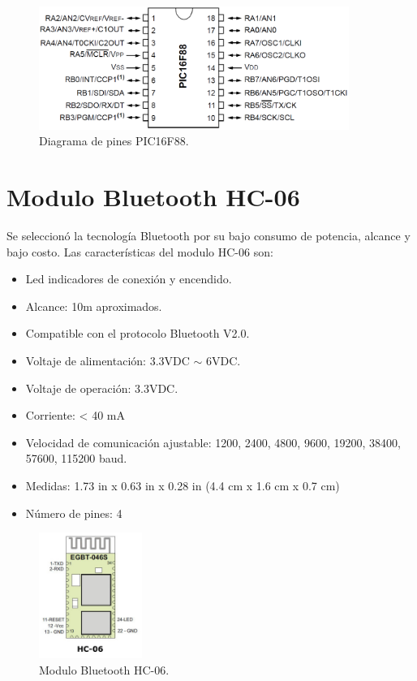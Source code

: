 \begin{figure}[H]
\centering
\includegraphics[width=0.9\textwidth]{./image/PIC16F88.png}
\caption{Diagrama de pines PIC16F88.}
\label{fig:PIC16F88}
\end{figure}


\section{Modulo Bluetooth HC-06}

Se seleccionó la tecnología Bluetooth por su bajo consumo de potencia, alcance y bajo costo. Las características del modulo HC-06 son:
\begin{itemize}
\item Led indicadores de conexión y encendido.
\item Alcance: 10m aproximados.
\item Compatible con el protocolo Bluetooth V2.0.
\item Voltaje de alimentación: 3.3VDC $\sim$ 6VDC.
\item Voltaje de operación: 3.3VDC.
\item Corriente: < 40 mA
\item Velocidad de comunicación ajustable: 1200, 2400, 4800, 9600, 19200, 38400, 57600, 115200 baud.
\item Medidas: 1.73 in x 0.63 in x 0.28 in (4.4 cm x 1.6 cm x 0.7 cm)
\item Número de pines: 4
\end{itemize}

\begin{figure}[H]
\centering
\includegraphics[width=0.3\textwidth]{./image/Blue_HC-06.png}
\caption{Modulo Bluetooth HC-06.}
\label{fig:Blue_HC-06}
\end{figure}

